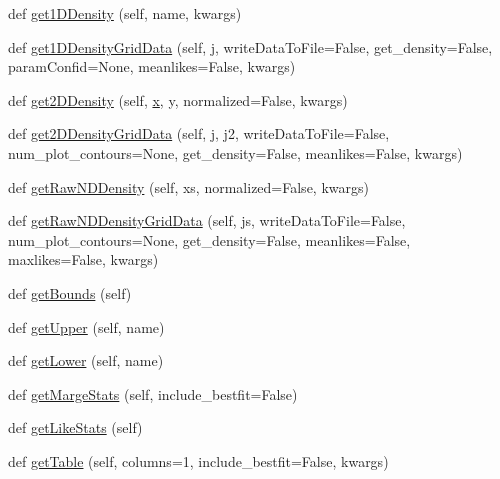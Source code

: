 \begin{DoxyCompactItemize}
\item 
def \mbox{\hyperlink{classgetdist_1_1mcsamples_1_1MCSamples_a67d8f66e8c759cac71fc3c0562faa74d}{get1\+D\+Density}} (self, name, kwargs)
\item 
def \mbox{\hyperlink{classgetdist_1_1mcsamples_1_1MCSamples_a53dc1a5889467700091389070326f0c9}{get1\+D\+Density\+Grid\+Data}} (self, \mbox{\hyperlink{plotcls_8m_ac86694252f8dfdb19aaeadc4b7c342c6}{j}}, write\+Data\+To\+File=False, get\+\_\+density=False, param\+Confid=None, meanlikes=False, kwargs)
\item 
def \mbox{\hyperlink{classgetdist_1_1mcsamples_1_1MCSamples_a0987c9312d821d6916322667f208ebcf}{get2\+D\+Density}} (self, \mbox{\hyperlink{plotTT_8m_a9336ebf25087d91c818ee6e9ec29f8c1}{x}}, y, normalized=False, kwargs)
\item 
def \mbox{\hyperlink{classgetdist_1_1mcsamples_1_1MCSamples_a591064d13448b148006ce8246ad4446f}{get2\+D\+Density\+Grid\+Data}} (self, \mbox{\hyperlink{plotcls_8m_ac86694252f8dfdb19aaeadc4b7c342c6}{j}}, j2, write\+Data\+To\+File=False, num\+\_\+plot\+\_\+contours=None, get\+\_\+density=False, meanlikes=False, kwargs)
\item 
def \mbox{\hyperlink{classgetdist_1_1mcsamples_1_1MCSamples_a35fd7d8a3b07a70a66a013e9cb265c95}{get\+Raw\+N\+D\+Density}} (self, xs, normalized=False, kwargs)
\item 
def \mbox{\hyperlink{classgetdist_1_1mcsamples_1_1MCSamples_a8a54d102a9c5428e83651b3585f0e148}{get\+Raw\+N\+D\+Density\+Grid\+Data}} (self, js, write\+Data\+To\+File=False, num\+\_\+plot\+\_\+contours=None, get\+\_\+density=False, meanlikes=False, maxlikes=False, kwargs)
\item 
def \mbox{\hyperlink{classgetdist_1_1mcsamples_1_1MCSamples_a3287df7eb2bf02ce8d38a6d307cb2548}{get\+Bounds}} (self)
\item 
def \mbox{\hyperlink{classgetdist_1_1mcsamples_1_1MCSamples_aa631bee569cca53afa3ea837f66e2a5b}{get\+Upper}} (self, name)
\item 
def \mbox{\hyperlink{classgetdist_1_1mcsamples_1_1MCSamples_ae742dde5f50c4a3acd861a011198fb7a}{get\+Lower}} (self, name)
\item 
def \mbox{\hyperlink{classgetdist_1_1mcsamples_1_1MCSamples_ac23f96add8b4fc35b7dd3a922fae119f}{get\+Marge\+Stats}} (self, include\+\_\+bestfit=False)
\item 
def \mbox{\hyperlink{classgetdist_1_1mcsamples_1_1MCSamples_aef6e63fe8a242f19517dd5bbdf6d3b2a}{get\+Like\+Stats}} (self)
\item 
def \mbox{\hyperlink{classgetdist_1_1mcsamples_1_1MCSamples_a2faa89318b77f8c9a09eec976272f54c}{get\+Table}} (self, columns=1, include\+\_\+bestfit=False, kwargs)

\end{DoxyCompactItemize}
